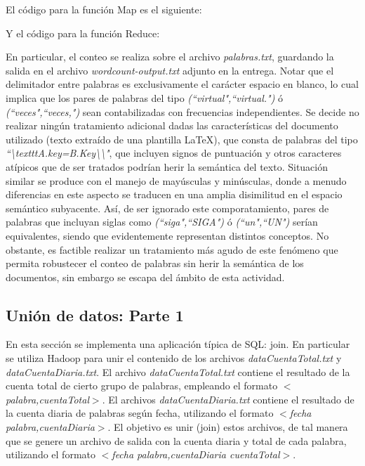 \documentclass[letterpaper, 10 pt, conference]{ieeeconf}  %
\begin{document}
\noindent El código para la función Map es el siguiente:



\noindent Y el código para la función Reduce:



En particular, el conteo se realiza sobre el archivo \textit{palabras.txt}, guardando la salida en el archivo \textit{wordcount-output.txt} adjunto en la entrega. Notar que el delimitador entre palabras es exclusivamente el carácter espacio en blanco, lo cual implica que los pares de palabras del tipo \textit{(``virtual",``virtual.")} ó \textit{(``veces",``veces,")} sean contabilizadas con frecuencias independientes. Se decide no realizar ningún tratamiento adicional dadas las características del documento utilizado (texto extraído de una plantilla \LaTeX), que consta de palabras del tipo \textit{``\textbackslash{}texttt{A.key=B.Key}\textbackslash{}\textbackslash{}"}, que incluyen signos de puntuación y otros caracteres atípicos que de ser tratados podrían herir la semántica del texto. Situación similar se produce con el manejo de mayúsculas y minúsculas, donde a menudo diferencias en este aspecto se traducen en una amplia disimilitud en el espacio semántico subyacente. Así, de ser ignorado este comporatamiento, pares de palabras que incluyan siglas como \textit{(``siga",``SIGA")} ó \textit{(``un",``UN")} serían equivalentes, siendo que evidentemente representan distintos conceptos. No obstante, es factible realizar un tratamiento más agudo de este fenómeno que permita robustecer el conteo de palabras sin herir la semántica de los documentos, sin embargo se escapa del ámbito de esta actividad.

\subsection{Unión de datos: Parte 1}

En esta sección se implementa una aplicación típica de SQL: join. En particular se utiliza Hadoop para unir el contenido de los archivos \textit{dataCuentaTotal.txt} y \textit{dataCuentaDiaria.txt}. El archivo \textit{dataCuentaTotal.txt} contiene el resultado de la cuenta total de cierto grupo de palabras, empleando el formato $<$\textit{palabra,cuentaTotal}$>$. El archivos \textit{dataCuentaDiaria.txt} contiene el resultado de la cuenta diaria de palabras según fecha, utilizando el formato $<$\textit{fecha palabra,cuentaDiaria}$>$. El objetivo es unir (join) estos archivos, de tal manera que se genere un archivo de salida con la cuenta diaria y total de cada palabra, utilizando el formato $<$\textit{fecha palabra,cuentaDiaria cuentaTotal}$>$. 
\end{document}
